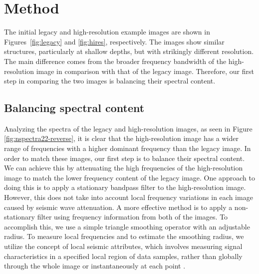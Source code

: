 \section{Method}

The initial legacy and high-resolution example images are shown in Figures~\ref{fig:legacy}
and \ref{fig:hires}, respectively. The images show similar structures, particularly at shallow depths, but with
strikingly different resolution. The main difference comes from the
broader frequency bandwidth of the high-resolution image in comparison
with that of the legacy image. Therefore, our first step in comparing
the two images is balancing their spectral content.

\subsection{Balancing spectral content}

Analyzing the spectra of the legacy and high-resolution images, as
seen in Figure \ref{fig:nspectra22-reverse}, it is clear that the
high-resolution image has a wider range of frequencies with a higher
dominant frequency than the legacy image. In order to match these
images, our first step is to balance their spectral content. We can achieve 
this by attenuating the high frequencies of the high-resolution image
to match the lower frequency content of the legacy image. One approach
to doing this is to apply a stationary bandpass filter to the
high-resolution image. However, this does not take into account
local frequency variations in each image caused by seismic wave attenuation.
A more effective method is to apply a non-stationary filter using
frequency information from both of the images. To accomplish this, we use a
simple triangle smoothing operator with an adjustable radius. 
To measure local frequencies and to estimate the smoothing radius, we
utilize the concept of local seismic attributes, which
involves measuring signal characteristics in a specified local region of data
samples, rather than globally through the whole image or
instantaneously at each point \cite[]{attr}.


